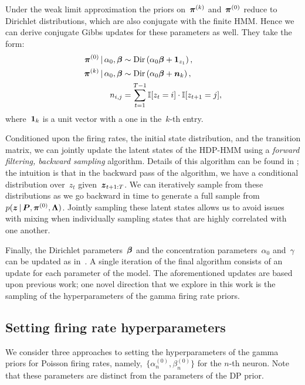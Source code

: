 Under the weak limit approximation the priors on~$\boldsymbol{\pi}^{(k)}$
and~$\boldsymbol{\pi}^{(0)}$ reduce to Dirichlet distributions, which are also conjugate
with the finite HMM. Hence we can derive conjugate Gibbs updates for
these parameters as well. They take the form:
\begin{align*}
  \boldsymbol{\pi}^{(0)} \,|\, \alpha_0, \boldsymbol{\beta} &\sim \mathrm{Dir}\left(\alpha_0\boldsymbol{\beta} + \boldsymbol{1}_{z_1}\right),\\
  \boldsymbol{\pi}^{(k)} \,|\, \alpha_0, \boldsymbol{\beta} &\sim \mathrm{Dir}\left(\alpha_0\boldsymbol{\beta} + \boldsymbol{n}_{k}\right),\\
  n_{i,j}&=\sum_{t=1}^{T-1} \mathbb{I}[z_t=i] \cdot \mathbb{I}[z_{t+1}=j],
\end{align*}
where~$\boldsymbol{1}_k$ is a unit vector with a one in the~$k$-th entry.

Conditioned upon the firing rates, the initial state distribution, and
the transition matrix, we can jointly update the latent states of the
HDP-HMM using a {\em forward filtering, backward sampling}
algorithm. Details of this algorithm can be found in
\citep{Johnson14b}; the intuition is that in the backward pass of the
algorithm, we have a conditional distribution over~$z_t$
given~$\boldsymbol{z}_{t+1:T}$. We can iteratively sample from these distributions
as we go backward in time to generate a full sample
from~${p(\boldsymbol{z} \,|\, \boldsymbol{P}, \boldsymbol{\pi}^{(0)}, \boldsymbol{\Lambda})}$. Jointly sampling
these latent states allows us to avoid issues with mixing when
individually sampling states that are highly correlated with one
another.

Finally, the Dirichlet parameters~$\boldsymbol{\beta}$ and the concentration
parameters~$\alpha_0$ and~$\gamma$ can be updated as
in~\citep{Teh06}. A single iteration of the final algorithm consists
of an update for each parameter of the model. The aforementioned
updates are based upon previous work; one novel direction that we
explore in this work is the sampling of the hyperparameters of the
gamma firing rate priors.

\subsection{Setting firing rate hyperparameters} 
\label{sec:fr_hypers}
We consider three approaches to setting the hyperparameters of the
gamma priors for Poisson firing rates, namely,~${\{\alpha_n^{(0)},
  \beta_n^{(0)}\}}$ for the $n$-th neuron.  Note that these parameters are
distinct from the parameters of the DP prior.


